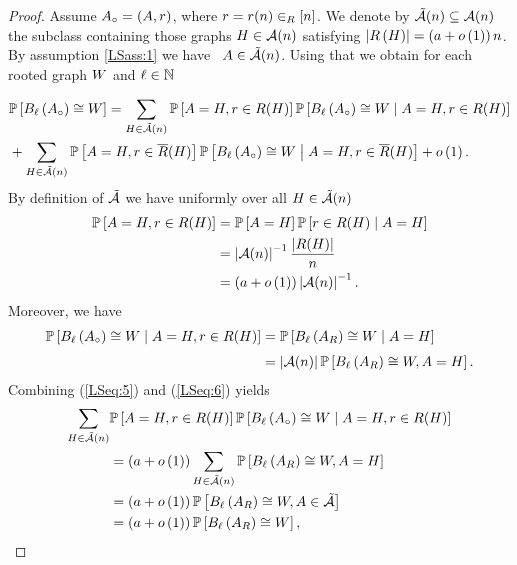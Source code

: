 \begin{proof}
Assume $A_\circ=\left(A, r\right)$, where $r=r(n)\in_R[n]$. We denote by $\tilde{\mathcal{A}}(n)\subseteq\mathcal{A}(n)$ the subclass containing those graphs $H\in\mathcal{A}(n)$ satisfying $\left|R\left(H\right)\right|=\left(a+o\left(1\right)\right)n$. By assumption \ref{LSass:1} we have \whp\ $A\in\tilde{\mathcal{A}}(n)$. Using that we obtain for each rooted graph $W$ and $\ell\in \mathbb{N}$

\begin{align}\label{LSeq:2}
&\mathbb{P}\left[B_{\ell}\left(A_\circ\right)\cong W\right]=\sum_{H\in\tilde{\mathcal{A}}(n)}\mathbb{P}\left[A=H,r\in R(H)\right]\mathbb{P}\left[B_{\ell}\left(A_\circ\right)\cong W \;\middle|\; A=H,r\in R(H)\right]\nonumber
\\&+\sum_{H\in\tilde{\mathcal{A}}(n)}\mathbb{P}\left[A=H,r\in \overline{R}(H)\right]\mathbb{P}\left[B_{\ell}\left(A_\circ\right)\cong W \;\middle|\; A=H,r\in \overline{R}(H)\right]+o\left(1\right).
\end{align}
By definition of $\tilde{\mathcal{A}}$ we have uniformly over all $H\in\tilde{\mathcal{A}}(n)$
\begin{align}\label{LSeq:5}
\mathbb{P}\left[A=H,r\in R(H)\right]&=\mathbb{P}\left[A=H\right]\mathbb{P}\left[r\in R(H) \;\middle|\; A=H\right]
\nonumber
\\
&=\left|\mathcal{A}(n)\right|^{-1}\frac{\left|R(H)\right|}{n}
\nonumber
\\
&= \left(a+o\left(1\right)\right)\left|\mathcal{A}(n)\right|^{-1}.
\end{align}
Moreover, we have
\begin{align}\label{LSeq:6}
\mathbb{P}\left[B_{\ell}\left(A_\circ\right)\cong W \;\middle|\; A=H,r\in R(H)\right]&=\mathbb{P}\left[B_{\ell}\left(A_{R}\right)\cong W \;\middle|\; A=H\right]
\nonumber
\\[0.1cm]
&=\left|\mathcal{A}(n)\right|\mathbb{P}\left[B_{\ell}\left(A_{R}\right)\cong W, A=H\right].
\end{align}
Combining (\ref{LSeq:5}) and (\ref{LSeq:6}) yields
\begin{align}\label{LSeq:7}
\sum_{H\in\tilde{\cl}(n)}&\prob{A=H,\root\in \rootSet(H)}\condprob{\ballP{\ell}{\unbiased{A}}\isomorphic\detGraph}{A=H,\root\in \rootSet(H)}
\nonumber
\\
&=\left(a+\smallo{1}\right)\sum_{H\in\tilde{\cl}(n)}\prob{\ballP{\ell}{A_{\rootSet}}\isomorphic\detGraph, A=H}\nonumber
\\
&=\left(a+\smallo{1}\right)\prob{\ballP{\ell}{A_{\rootSet}}\isomorphic\detGraph, A\in\tilde{\cl}}\nonumber
\\
&
=\left(a+\smallo{1}\right)\prob{\ballP{\ell}{A_{\rootSet}}\isomorphic\detGraph},

\end{align}
\end{proof}
